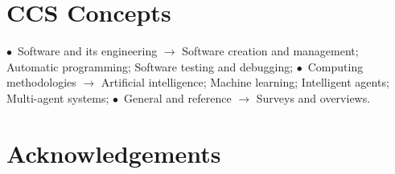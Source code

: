 \documentclass{acm_sen_article}
\begin{document}
\section*{CCS Concepts}
$\bullet$~Software and its engineering $\rightarrow$ Software creation and management; Automatic programming; Software testing and debugging;
$\bullet$~Computing methodologies $\rightarrow$ Artificial intelligence; Machine learning; Intelligent agents; Multi-agent systems;
$\bullet$~General and reference $\rightarrow$ Surveys and overviews.









\section*{Acknowledgements}


{\footnotesize


}
\end{document}
